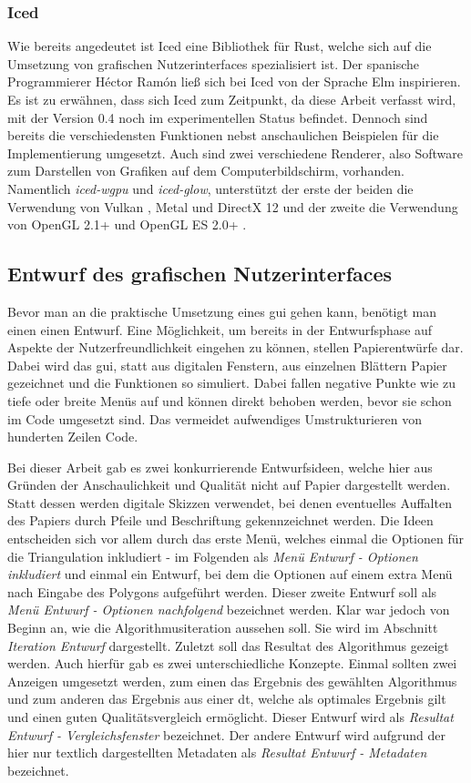 \subsubsection{Iced}
Wie bereits angedeutet ist Iced eine Bibliothek für Rust, welche sich auf die Umsetzung von grafischen Nutzerinterfaces spezialisiert ist.
Der spanische Programmierer Héctor Ramón ließ sich bei Iced von der Sprache Elm inspirieren. Es ist zu erwähnen, dass sich Iced zum Zeitpunkt, da diese Arbeit verfasst wird, mit der Version 
0.4 noch im experimentellen Status befindet. Dennoch sind bereits die verschiedensten Funktionen nebst anschaulichen Beispielen für die Implementierung umgesetzt. Auch sind zwei verschiedene 
Renderer, also Software zum Darstellen von Grafiken auf dem Computerbildschirm, vorhanden. Namentlich \emph{iced-wgpu} und \emph{iced-glow}, unterstützt der erste der beiden die Verwendung von 
Vulkan \cite{vulkan}, Metal \cite{metal} und DirectX 12 \cite{dx12} und der zweite die Verwendung von OpenGL 2.1+ \cite{opgl} und OpenGL ES 2.0+ \cite{opgles}. \cite{iced}

\subsection{Entwurf des grafischen Nutzerinterfaces}
Bevor man an die praktische Umsetzung eines \ac{gui} gehen kann, benötigt man einen einen Entwurf. Eine Möglichkeit, um bereits in der Entwurfsphase auf Aspekte der Nutzerfreundlichkeit eingehen zu können, 
stellen Papierentwürfe dar. Dabei wird das \ac{gui}, statt aus digitalen Fenstern, aus einzelnen Blättern Papier gezeichnet und die Funktionen so simuliert. Dabei fallen negative Punkte wie zu tiefe oder breite 
Menüs auf und können direkt behoben werden, bevor sie schon im Code umgesetzt sind. Das vermeidet aufwendiges Umstrukturieren von hunderten Zeilen Code.

Bei dieser Arbeit gab es zwei konkurrierende Entwurfsideen, welche hier aus Gründen der Anschaulichkeit und Qualität nicht auf Papier dargestellt werden. Statt dessen werden digitale Skizzen verwendet, bei denen eventuelles Auffalten des Papiers
durch Pfeile und Beschriftung gekennzeichnet werden. 
Die Ideen entscheiden sich vor allem durch das erste Menü, welches einmal die Optionen für die Triangulation inkludiert - im Folgenden als \emph{Menü Entwurf - Optionen inkludiert} und einmal ein Entwurf, bei dem 
die Optionen auf einem extra Menü nach Eingabe des Polygons aufgeführt werden. Dieser zweite Entwurf soll als \emph{Menü Entwurf - Optionen nachfolgend} bezeichnet werden.
Klar war jedoch von Beginn an, wie die Algorithmusiteration aussehen soll. Sie wird im Abschnitt \emph{Iteration Entwurf} dargestellt.
Zuletzt soll das Resultat des Algorithmus gezeigt werden. Auch hierfür gab es zwei unterschiedliche Konzepte. Einmal sollten zwei Anzeigen umgesetzt werden, zum einen das Ergebnis des gewählten Algorithmus und zum anderen das 
Ergebnis aus einer \ac{dt}, welche als optimales Ergebnis gilt und einen guten Qualitätsvergleich ermöglicht. Dieser Entwurf wird als \emph{Resultat Entwurf - Vergleichsfenster} bezeichnet.
Der andere Entwurf wird aufgrund der hier nur textlich dargestellten Metadaten als \emph{Resultat Entwurf - Metadaten} bezeichnet.


